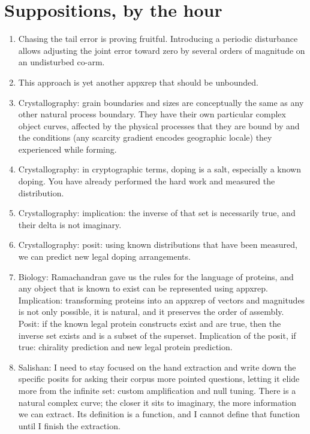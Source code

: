 \chapter{Suppositions, by the hour}

\begin{enumerate}
\item Chasing the tail error is proving fruitful. Introducing a periodic disturbance allows adjusting
the joint error toward zero by several orders of magnitude on an undisturbed co-arm.

\item This approach is yet another appxrep that should be unbounded.

\item Crystallography: grain boundaries and sizes are conceptually the same as any other natural
process boundary. They have their own particular complex object curves, affected by the physical
processes that they are bound by and the conditions (any scarcity gradient encodes geographic locale)
they experienced while forming.

\item Crystallography: in cryptographic terms, doping is a salt, especially a known doping. You have
already performed the hard work and measured the distribution.

\item Crystallography: implication: the inverse of that set is necessarily true, and their delta is
not imaginary.

\item Crystallography: posit: using known distributions that have been measured, we can predict new
legal doping arrangements.

\item Biology: Ramachandran gave us the rules for the language of proteins, and any object that is
known to exist can be represented using appxrep. Implication: transforming proteins into an appxrep
of vectors and magnitudes is not only possible, it is natural, and it preserves the order of
assembly. Posit: if the known legal protein constructs exist and are true, then the inverse set
exists and is a subset of the superset. Implication of the posit, if true: chirality prediction and
new legal protein prediction.

\item Salishan: I need to stay focused on the hand extraction and write down the specific posits for
asking their corpus more pointed questions, letting it elide more from the infinite set: custom
amplification and null tuning. There is a natural complex curve; the closer it sits to imaginary, the
more information we can extract. Its definition is a function, and I cannot define that function
until I finish the extraction.


\end{enumerate}
